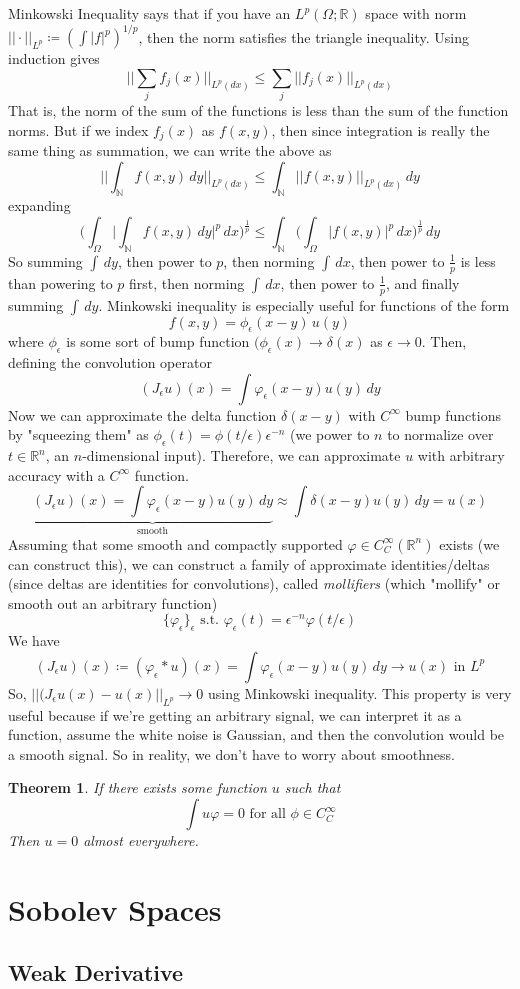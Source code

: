 \documentclass{article}
\newtheorem{theorem}{Theorem}[section]
\theoremstyle{remark}
\theoremstyle{definition}
\begin{document}
Minkowski Inequality says that if you have an $L^p(\Omega; \mathbb{R})$ space with norm $|| \cdot ||_{L^p} \coloneqq ( \int |f|^p )^{1/p}$, then the norm satisfies the triangle inequality. Using induction gives
\[\bigg| \bigg| \sum_j f_j (x) \bigg| \bigg|_{L^p (dx)} \leq \sum_j \big| \big| f_j (x) \big| \big|_{L^p (dx)}\]
That is, the norm of the sum of the functions is less than the sum of the function norms. But if we index $f_j (x)$ as $f(x, y)$, then since integration is really the same thing as summation, we can write the above as 
\[\bigg| \bigg| \int_{\mathbb{N}} f(x, y) \,dy \bigg| \bigg|_{L^p (dx)} \leq \int_\mathbb{N} \big| \big| f(x, y) \big| \big|_{L^p (dx)} \,dy \]
expanding 
\[\bigg( \int_\Omega \bigg| \int_{\mathbb{N}} f(x, y) \,dy \bigg|^p \, dx \bigg)^{\frac{1}{p}} \leq \int_\mathbb{N} \bigg( \int_\Omega \big| f(x, y) \big|^{p} \,dx \bigg)^{\frac{1}{p}} \, dy\]
So summing $\int\,dy$, then power to $p$, then norming $\int\,dx$, then power to $\frac{1}{p}$ is less than powering to $p$ first, then norming $\int\,dx$, then power to $\frac{1}{p}$, and finally summing $\int \, dy$. Minkowski inequality is especially useful for functions of the form 
\[f(x, y) = \phi_\epsilon (x - y) \, u(y)\]
where $\phi_\epsilon$ is some sort of bump function $(\phi_\epsilon (x) \rightarrow \delta (x)$ as $\epsilon \rightarrow 0$. Then, defining the convolution operator 
\[(J_\epsilon u) (x) = \int \varphi_\epsilon (x - y) u(y)\, dy\]
Now we can approximate the delta function $\delta (x - y)$ with $C^\infty$ bump functions by "squeezing them" as $\phi_\epsilon (t) = \phi(t / \epsilon) \epsilon^{-n}$ (we power to $n$ to normalize over $t \in \mathbb{R}^n$, an $n$-dimensional input). Therefore, we can approximate $u$ with arbitrary accuracy with a $C^\infty$ function. 
\[\underbrace{(J_\epsilon u) (x) = \int \varphi_\epsilon (x - y) u(y)\, dy}_{\text{smooth}} \approx \int \delta (x - y) u(y) \,dy = u(x)\]
Assuming that some smooth and compactly supported $\varphi \in C^\infty_C (\mathbb{R}^n)$ exists (we can construct this), we can construct a family of approximate identities/deltas (since deltas are identities for convolutions), called \textit{mollifiers} (which "mollify" or smooth out an arbitrary function) 
\[\{\varphi_\epsilon\}_\epsilon \text{ s.t. } \varphi_\epsilon (t) = \epsilon^{-n} \varphi(t / \epsilon)\]
We have 
\[(J_\epsilon u) (x) \coloneqq (\varphi_\epsilon \ast u) (x) = \int \varphi_\epsilon (x - y) u(y) \, dy \rightarrow u(x) \text{ in } L^p\]
So, $||(J_\epsilon u (x) - u(x)||_{L^p} \rightarrow 0$ using Minkowski inequality. This property is very useful because if we're getting an arbitrary signal, we can interpret it as a function, assume the white noise is Gaussian, and then the convolution would be a smooth signal. So in reality, we don't have to worry about smoothness. 

\begin{theorem}
If there exists some function $u$ such that 
\[\int u \varphi = 0 \text{ for all } \phi \in C^\infty_C\]
Then $u = 0$ almost everywhere. 
\end{theorem}

\section{Sobolev Spaces}


\subsection{Weak Derivative}
\end{document}
